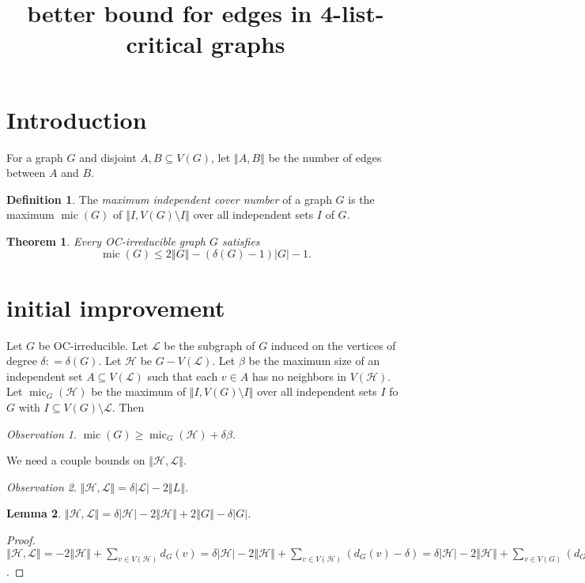 \documentclass[12pt]{article}
\title{better bound for edges in 4-list-critical graphs}
\theoremstyle{plain}
\newtheorem{thm}{Theorem}[section]
\newtheorem{lem}[thm]{Lemma}
\theoremstyle{definition}
\newtheorem{defn}{Definition}
\theoremstyle{remark}
\newtheorem*{observation}{Observation}
\newcommand{\fancy}[1]{\mathcal{#1}}
\renewcommand{\L}{\fancy{L}}
\newcommand{\HH}{\fancy{H}}
\newcommand{\card}[1]{\left|#1\right|}
\newcommand{\size}[1]{\left\Vert#1\right\Vert}
\newcommand{\parens}[1]{\left( #1 \right)}
\newcommand{\DefinedAs}{\mathrel{\mathop:}=}
\newcommand{\mic}{\operatorname{mic}}
\begin{document}
\maketitle
\begin{abstract}
\end{abstract}

\section{Introduction}
For a graph $G$ and disjoint $A, B \subseteq V(G)$, let $\size{A,B}$ be the number of edges between $A$ and $B$.

\begin{defn} The \emph{maximum independent cover number }of a graph $G$
	is the maximum $\mic(G)$ of $\size{I, V(G) \setminus I}$ over all independent sets $I$
	of $G$. 
\end{defn}

\begin{thm}\label{ConsantListMicStrength} 
	Every OC-irreducible graph $G$ satisfies
	$$\mic(G)\leq2\size{G}-(\delta(G)-1)\card{G}-1.$$
\end{thm}

\section{initial improvement}
Let $G$ be OC-irreducible.  Let $\L$ be the subgraph of $G$ induced on the vertices of degree $\delta \DefinedAs \delta(G)$. Let $\HH$ be $G - V(\L)$.  Let $\beta$ be the maximum size of an independent set $A \subseteq V(\L)$ such that each $v \in A$ has no neighbors in $V(\HH)$.  Let $\mic_G(\HH)$ be the maximum of $\size{I, V(G) \setminus I}$ over all independent sets $I$ fo $G$ with $I \subseteq V(G) \setminus \L$.  Then

\begin{observation}
	$\mic(G) \ge \mic_G(\HH) + \delta\beta$.
\end{observation}

We need a couple bounds on $\size{\HH, \L}$.  

\begin{observation}
	$\size{\HH, \L} = \delta\card{\L} - 2\size{L}$.
\end{observation}

\begin{lem}
	$\size{\HH, \L} = \delta\card{\HH} - 2\size{\HH} + 2\size{G} - \delta\card{G}$.
\end{lem}
\begin{proof}
	$\size{\HH, \L} = -2\size{\HH} + \sum_{v \in V(\HH)} d_G(v) = \delta\card{\HH} - 2\size{\HH} + \sum_{v \in V(\HH)} \parens{d_G(v) - \delta} = \delta\card{\HH} - 2\size{\HH} + \sum_{v \in V(G)} \parens{d_G(v) - \delta}$.
\end{proof}
\end{document}
